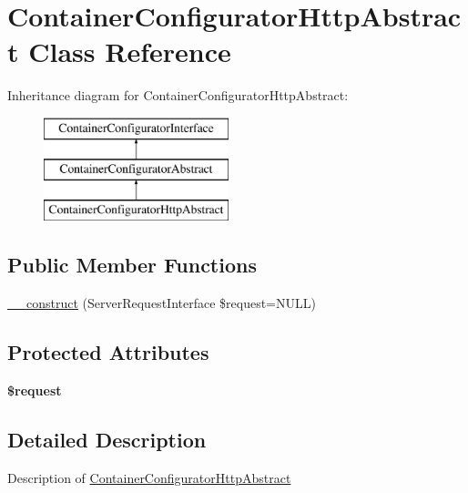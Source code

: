 \hypertarget{class_pes_1_1_container_1_1_container_configurator_http_abstract}{}\section{Container\+Configurator\+Http\+Abstract Class Reference}
\label{class_pes_1_1_container_1_1_container_configurator_http_abstract}
Inheritance diagram for Container\+Configurator\+Http\+Abstract\+:\begin{figure}[H]
\begin{center}
\leavevmode
\includegraphics[height=3.000000cm]{class_pes_1_1_container_1_1_container_configurator_http_abstract}
\end{center}
\end{figure}
\subsection*{Public Member Functions}
\begin{DoxyCompactItemize}
\item 
\mbox{\hyperlink{class_pes_1_1_container_1_1_container_configurator_http_abstract_ad9fd33cd0f1d244412d6d6398a971dd8}{\+\_\+\+\_\+construct}} (Server\+Request\+Interface \$request=N\+U\+LL)
\end{DoxyCompactItemize}
\subsection*{Protected Attributes}
\begin{DoxyCompactItemize}
\item 
\mbox{\label{class_pes_1_1_container_1_1_container_configurator_http_abstract_abb35c8495a232b510389fa6d7b15d38a}} 
{\bfseries \$request}
\end{DoxyCompactItemize}


\subsection{Detailed Description}
Description of \mbox{\hyperlink{class_pes_1_1_container_1_1_container_configurator_http_abstract}{Container\+Configurator\+Http\+Abstract}}

